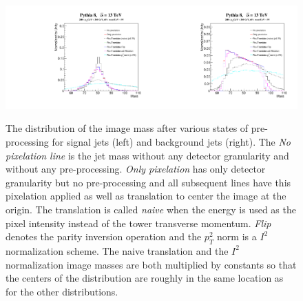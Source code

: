 \begin{figure}[bt]
  \begin{center}
        \includegraphics[width=0.5\textwidth]{figures/ImageMass_Comparison.pdf}\includegraphics[width=0.5\textwidth]{figures/ImageMass_Comparison_back.pdf}
      \caption{ The distribution of the image mass after various states of pre-processing for signal jets (left) and background jets (right).  The {\it No pixelation line} is the jet mass without any detector granularity and without any pre-processing.  {\it Only pixelation} has only detector granularity but no pre-processing and all subsequent lines have this pixelation applied as well as translation to center the image at the origin.  The translation is called {\it naive} when the energy is used as the pixel intensity instead of the tower transverse momentum.  {\it Flip} denotes the parity inversion operation and the $p_T^2$ norm is a $I^2$ normalization scheme.  The naive translation and the $I^2$ normalization image masses are both multiplied by constants so that the centers of the distribution are roughly in the same location as for the other distributions.
      \label{fig:preprocess2} }
    \end{center}
\end{figure}


